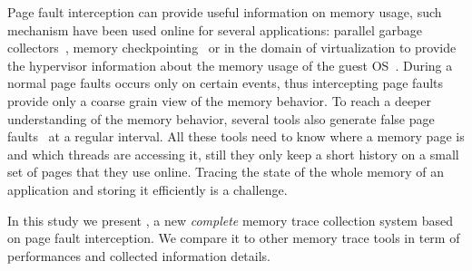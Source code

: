 Page fault interception can provide useful information on memory usage,
such mechanism have been used online for several applications: parallel
garbage collectors~\cite{Boehm91Mostly}, memory
checkpointing~\cite{Heo05Spaceefficient} or in the domain of virtualization to
provide the hypervisor information about the memory usage of the guest
OS~\cite{Jones06Geiger}. During a normal page faults occurs only on certain
events, thus intercepting page faults provide only a coarse grain view of the
memory behavior. To reach a deeper understanding of the memory behavior,
several tools also generate false page
faults~\cite{Bae12Dynamic,Diener13CommunicationBased} at a regular interval.
All these tools need to know where a memory page is and which threads are
accessing it, still they only keep a short history on a small set of pages that
they use online. Tracing the state of the whole memory of an application and
storing it efficiently is a challenge.

In this study we present \Moca, a new \emph{complete} memory trace collection system based on page
fault interception. We compare it to other memory trace tools in term of
performances and collected information details.
